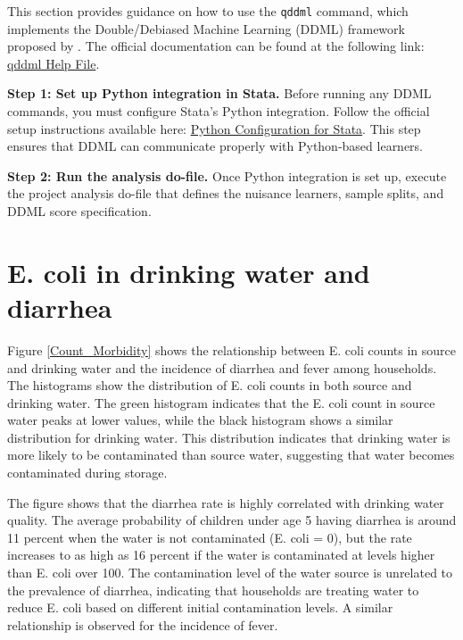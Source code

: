 \documentclass [11pt]{article}
\theoremstyle{plain}
\theoremstyle{definition}
\theoremstyle{remark}
\newcommand{\1}{\bm{1}}
\begin{document}
\begin{appendices}
This section provides guidance on how to use the \texttt{qddml} command, which implements the Double/Debiased Machine Learning (DDML) framework proposed by \citet{chernozhukov2018dml}.  
The official documentation can be found at the following link:  
\href{https://statalasso.github.io/docs/ddml/help/}{qddml Help File}.

\bigskip
\noindent
\textbf{Step 1: Set up Python integration in Stata.}  
Before running any DDML commands, you must configure Stata’s Python integration.  
Follow the official setup instructions available here:  
\href{https://statalasso.github.io/docs/python/}{Python Configuration for Stata}.  
This step ensures that DDML can communicate properly with Python-based learners.

\bigskip
\noindent
\textbf{Step 2: Run the analysis do-file.}  
Once Python integration is set up, execute the project analysis do-file that defines the nuisance learners, sample splits, and DDML score specification.

\clearpage
\section{E. coli in drinking water and diarrhea}  

Figure \ref{Count_Morbidity} shows the relationship between E. coli counts in source and drinking water and the incidence of diarrhea and fever among households. The histograms show the distribution of E. coli counts in both source and drinking water. The green histogram indicates that the E. coli count in source water peaks at lower values, while the black histogram shows a similar distribution for drinking water. This distribution indicates that drinking water is more likely to be contaminated than source water, suggesting that water becomes contaminated during storage.

The figure shows that the diarrhea rate is highly correlated with drinking water quality. The average probability of children under age 5 having diarrhea is around 11 percent when the water is not contaminated (E. coli = 0), but the rate increases to as high as 16 percent if the water is contaminated at levels higher than E. coli over 100. The contamination level of the water source is unrelated to the prevalence of diarrhea, indicating that households are treating water to reduce E. coli based on different initial contamination levels. A similar relationship is observed for the incidence of fever.


\end{appendices}
\end{document}
